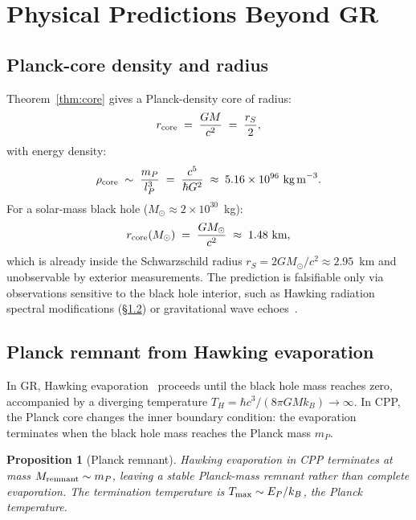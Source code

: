 \documentclass[12pt]{article}
\newtheorem{proposition}[theorem]{Proposition}
\newcommand{\lP}{l_P}
\newcommand{\EP}{E_P}
\newcommand{\mP}{m_P}
\begin{document}
\section{Physical Predictions Beyond GR}
\label{sec:predictions}

\subsection{Planck-core density and radius}
\label{subsec:planck_core}

Theorem~\ref{thm:core} gives a Planck-density core of radius:
\begin{equation}
  r_{\rm core} \;=\; \frac{GM}{c^2} \;=\; \frac{r_S}{2},
  \label{eq:core_radius}
\end{equation}
with energy density:
\begin{equation}
  \rho_{\rm core} \;\sim\; \frac{\mP}{\lP^3}
  \;=\; \frac{c^5}{\hbar G^2}
  \;\approx\; 5.16\times 10^{96}\ \text{kg\,m}^{-3}.
  \label{eq:core_density}
\end{equation}
For a solar-mass black hole ($M_\odot \approx 2\times 10^{30}$~kg):
\begin{equation}
  r_{\rm core}(M_\odot) \;=\; \frac{GM_\odot}{c^2}
  \;\approx\; 1.48\ \text{km},
\end{equation}
which is already inside the Schwarzschild radius
$r_S = 2GM_\odot/c^2 \approx 2.95$~km and unobservable by exterior
measurements.  The prediction is falsifiable only via observations
sensitive to the black hole interior, such as Hawking radiation
spectral modifications (§\ref{subsec:hawking}) or gravitational wave
echoes~\cite{cardoso2016}.

\subsection{Planck remnant from Hawking evaporation}
\label{subsec:hawking}

In GR, Hawking evaporation~\cite{hawking1975} proceeds until the black
hole mass reaches zero, accompanied by a diverging temperature
$T_H = \hbar c^3/(8\pi G M k_B) \to \infty$.  In CPP, the Planck core
changes the inner boundary condition: the evaporation terminates when
the black hole mass reaches the Planck mass $\mP$.

\begin{proposition}[Planck remnant]
\label{prop:remnant}
Hawking evaporation in CPP terminates at mass $M_{\rm remnant} \sim \mP$,
leaving a stable Planck-mass remnant rather than complete evaporation.
The termination temperature is $T_{\rm max} \sim \EP/k_B$, the
Planck temperature.
\end{proposition}
\end{document}

